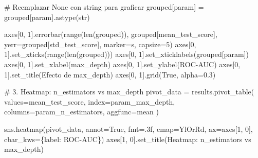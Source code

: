 \documentclass[
  doc,
  floatsintext,
  longtable,
  a4paper,
  nolmodern,
  notxfonts,
  notimes,
  12pt,
  colorlinks=true,linkcolor=blue,citecolor=blue,urlcolor=blue]{apa7}
\newenvironment{Shaded}{\begin{snugshade}}{\end{snugshade}}
\newcommand{\BuiltInTok}[1]{\textcolor[rgb]{0.00,0.23,0.31}{#1}}
\newcommand{\CommentTok}[1]{\textcolor[rgb]{0.37,0.37,0.37}{#1}}
\newcommand{\DecValTok}[1]{\textcolor[rgb]{0.68,0.00,0.00}{#1}}
\newcommand{\FloatTok}[1]{\textcolor[rgb]{0.68,0.00,0.00}{#1}}
\newcommand{\NormalTok}[1]{\textcolor[rgb]{0.00,0.23,0.31}{#1}}
\newcommand{\OperatorTok}[1]{\textcolor[rgb]{0.37,0.37,0.37}{#1}}
\newcommand{\StringTok}[1]{\textcolor[rgb]{0.13,0.47,0.30}{#1}}
\newcommand{\VariableTok}[1]{\textcolor[rgb]{0.07,0.07,0.07}{#1}}
\begin{document}
\begin{Shaded}
\begin{Highlighting}[]
\CommentTok{\# Reemplazar None con string para graficar}
\NormalTok{grouped[param] }\OperatorTok{=}\NormalTok{ grouped[param].astype(}\BuiltInTok{str}\NormalTok{)}

\NormalTok{axes[}\DecValTok{0}\NormalTok{, }\DecValTok{1}\NormalTok{].errorbar(}\BuiltInTok{range}\NormalTok{(}\BuiltInTok{len}\NormalTok{(grouped)), grouped[}\StringTok{\textquotesingle{}mean\_test\_score\textquotesingle{}}\NormalTok{],}
\NormalTok{                    yerr}\OperatorTok{=}\NormalTok{grouped[}\StringTok{\textquotesingle{}std\_test\_score\textquotesingle{}}\NormalTok{], marker}\OperatorTok{=}\StringTok{\textquotesingle{}s\textquotesingle{}}\NormalTok{, capsize}\OperatorTok{=}\DecValTok{5}\NormalTok{)}
\NormalTok{axes[}\DecValTok{0}\NormalTok{, }\DecValTok{1}\NormalTok{].set\_xticks(}\BuiltInTok{range}\NormalTok{(}\BuiltInTok{len}\NormalTok{(grouped)))}
\NormalTok{axes[}\DecValTok{0}\NormalTok{, }\DecValTok{1}\NormalTok{].set\_xticklabels(grouped[param])}
\NormalTok{axes[}\DecValTok{0}\NormalTok{, }\DecValTok{1}\NormalTok{].set\_xlabel(}\StringTok{\textquotesingle{}max\_depth\textquotesingle{}}\NormalTok{)}
\NormalTok{axes[}\DecValTok{0}\NormalTok{, }\DecValTok{1}\NormalTok{].set\_ylabel(}\StringTok{\textquotesingle{}ROC{-}AUC\textquotesingle{}}\NormalTok{)}
\NormalTok{axes[}\DecValTok{0}\NormalTok{, }\DecValTok{1}\NormalTok{].set\_title(}\StringTok{\textquotesingle{}Efecto de max\_depth\textquotesingle{}}\NormalTok{)}
\NormalTok{axes[}\DecValTok{0}\NormalTok{, }\DecValTok{1}\NormalTok{].grid(}\VariableTok{True}\NormalTok{, alpha}\OperatorTok{=}\FloatTok{0.3}\NormalTok{)}

\CommentTok{\# 3. Heatmap: n\_estimators vs max\_depth}
\NormalTok{pivot\_data }\OperatorTok{=}\NormalTok{ results.pivot\_table(}
\NormalTok{    values}\OperatorTok{=}\StringTok{\textquotesingle{}mean\_test\_score\textquotesingle{}}\NormalTok{,}
\NormalTok{    index}\OperatorTok{=}\StringTok{\textquotesingle{}param\_max\_depth\textquotesingle{}}\NormalTok{,}
\NormalTok{    columns}\OperatorTok{=}\StringTok{\textquotesingle{}param\_n\_estimators\textquotesingle{}}\NormalTok{,}
\NormalTok{    aggfunc}\OperatorTok{=}\StringTok{\textquotesingle{}mean\textquotesingle{}}
\NormalTok{)}

\NormalTok{sns.heatmap(pivot\_data, annot}\OperatorTok{=}\VariableTok{True}\NormalTok{, fmt}\OperatorTok{=}\StringTok{\textquotesingle{}.3f\textquotesingle{}}\NormalTok{, cmap}\OperatorTok{=}\StringTok{\textquotesingle{}YlOrRd\textquotesingle{}}\NormalTok{, }
\NormalTok{            ax}\OperatorTok{=}\NormalTok{axes[}\DecValTok{1}\NormalTok{, }\DecValTok{0}\NormalTok{], cbar\_kws}\OperatorTok{=}\NormalTok{\{}\StringTok{\textquotesingle{}label\textquotesingle{}}\NormalTok{: }\StringTok{\textquotesingle{}ROC{-}AUC\textquotesingle{}}\NormalTok{\})}
\NormalTok{axes[}\DecValTok{1}\NormalTok{, }\DecValTok{0}\NormalTok{].set\_title(}\StringTok{\textquotesingle{}Heatmap: n\_estimators vs max\_depth\textquotesingle{}}\NormalTok{)}


\end{Highlighting}
\end{Shaded}
\end{document}
